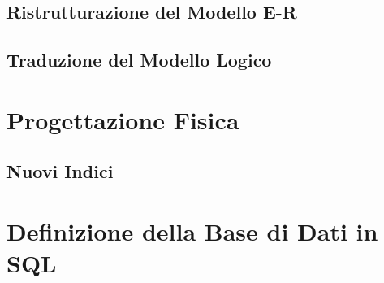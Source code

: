 \documentclass{article}
\begin{document}
\subsection{Ristrutturazione del Modello E-R}
\subsection{Traduzione del Modello Logico}


% 
% 
% 
% 
% 
% 




\clearpage
\section{Progettazione Fisica}
\subsection{Nuovi Indici}




\clearpage
\section{Definizione della Base di Dati in SQL}
\end{document}
